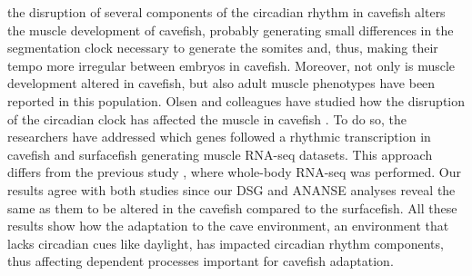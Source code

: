 the disruption of several components of the circadian rhythm in cavefish alters the muscle development of cavefish, probably generating small differences in the segmentation clock necessary to generate the somites and, thus, making their tempo more irregular between embryos in cavefish. Moreover, not only is muscle development altered in cavefish, but also adult muscle phenotypes have been reported in this population. Olsen and colleagues have studied how the disruption of the circadian clock has affected the muscle in cavefish \parencite{olsen_circadian_2023}. To do so, the researchers have addressed which genes followed a rhythmic transcription in cavefish and surfacefish generating muscle RNA-seq datasets. This approach differs from the previous study \parencite{mack_repeated_2021}, where whole-body RNA-seq was performed. Our results agree with both studies since our DSG and ANANSE analyses reveal the same as them to be altered in the cavefish compared to the surfacefish. All these results show how the adaptation to the cave environment, an environment that lacks circadian cues like daylight, has impacted circadian rhythm components, thus affecting dependent processes important for cavefish adaptation.




